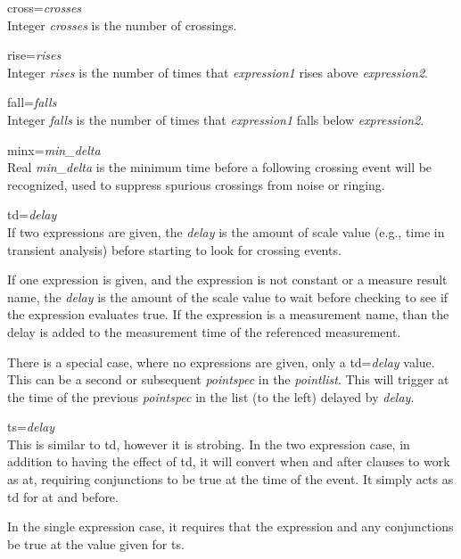 \begin{description}
\item{{\vt cross=}{\it crosses}}\\
Integer {\it crosses} is the number of crossings.

\item{{\vt rise=}{\it rises}}\\
Integer {\it rises} is the number of times that {\it expression1}
rises above {\it expression2}.

\item{{\vt fall=}{\it falls}}\\
Integer {\it falls} is the number of times that {\it expression1}
falls below {\it expression2}.

\item{{\vt minx=}{\it min\_delta}}\\
Real {\it min\_delta} is the minimum time before a following crossing
event will be recognized, used to suppress spurious crossings from
noise or ringing.
\end{description}

\begin{description}
\item{{\vt td=}{\it delay}}\\
If two expressions are given, the {\it delay} is the amount of scale
value (e.g., time in transient analysis) before starting to look for
crossing events.

If one expression is given, and the expression is not constant or a
measure result name, the {\it delay} is the amount of the scale value
to wait before checking to see if the expression evaluates true.  If
the expression is a measurement name, than the delay is added to the
measurement time of the referenced measurement.

There is a special case, where no expressions are given, only a {\vt
td=}{\it delay} value.  This can be a second or subsequent {\it
pointspec} in the {\it pointlist}.  This will trigger at the time of
the previous {\it pointspec} in the list (to the left) delayed by {\it
delay}.

\item{{\vt ts=}{\it delay}}\\
This is similar to {\vt td}, however it is strobing.  In the two
expression case, in addition to having the effect of {\vt td}, it will
convert {\vt when} and {\vt after} clauses to work as {\vt at},
requiring conjunctions to be true at the time of the event.  It simply
acts as {\vt td} for {\vt at} and {\vt before}.

In the single expression case, it requires that the expression and
any conjunctions be true at the value given for {\vt ts}.
\end{description}

